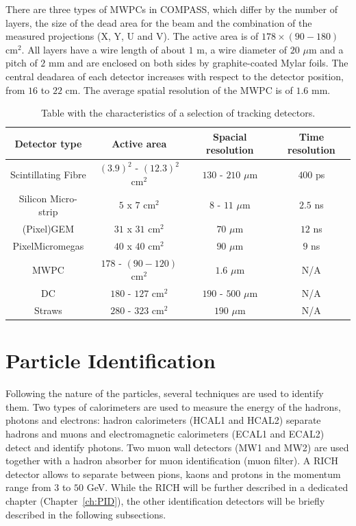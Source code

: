 There are three types of MWPCs in COMPASS, which differ by the number of layers, the size of the dead area for the beam and the combination of the measured projections (X, Y, U and V). The active area is of $178 \times (90-180)$ cm$^2$. All layers have a wire length of about $1$ m, a wire diameter of $20$ $\mu$m and a pitch of $2$ mm and are enclosed on both sides by graphite-coated Mylar foils. The central deadarea of each detector increases with respect to the detector position, from $16$ to $22$ cm. The average spatial resolution of the MWPC is of $1.6$ mm.

\begin{table}[!h]
  \caption{Table with the characteristics of a selection of tracking detectors.}
  \label{tab:kinvar}
  \centering
  \begin{tabular}{c|c|c|c}
    \hline
    \hline
    Detector type & Active area & Spacial resolution & Time resolution \\
    \hline
    \hline
    Scintillating Fibre & $(3.9)^2$ - $(12.3)^2$ cm$^2$ & $130$ - $210$ $\mu$m & $400$ ps \\
    Silicon Micro-strip & $5$ x $7$ cm$^2$ & $8$ - $11$ $\mu$m & $2.5$ ns \\
    (Pixel)GEM & $31$ x $31$ cm$^2$ & $70$ $\mu$m & $12$ ns \\
    PixelMicromegas & $40$ x $40$ cm$^2$ & $90$ $\mu$m & $9$ ns \\
    MWPC & $178$ - $(90-120)$ cm$^2$ & $1.6$ $\mu$m & N/A \\
    DC & $180$ - $127$ cm$^2$ & $190$ - $500$ $\mu$m & N/A \\
    Straws & $280$ - $323$ cm$^2$ & $190$ $\mu$m & N/A \\
    \hline
    \hline
  \end{tabular}
\end{table}


\section{Particle Identification}

Following the nature of the particles, several techniques are used to identify them. Two types of calorimeters are used to measure the energy of the hadrons, photons and electrons: hadron calorimeters (HCAL1 and HCAL2) separate hadrons and muons and electromagnetic calorimeters (ECAL1 and ECAL2) detect and identify photons. Two muon wall detectors (MW1 and MW2) are used together with a hadron absorber for muon identification (muon filter). A RICH detector allows to separate between pions, kaons and protons in the momentum range from $3$ to $50$ GeV. While the RICH will be further described in a dedicated chapter (Chapter~\ref{ch:PID}), the other identification detectors will be briefly described in the following subsections.

